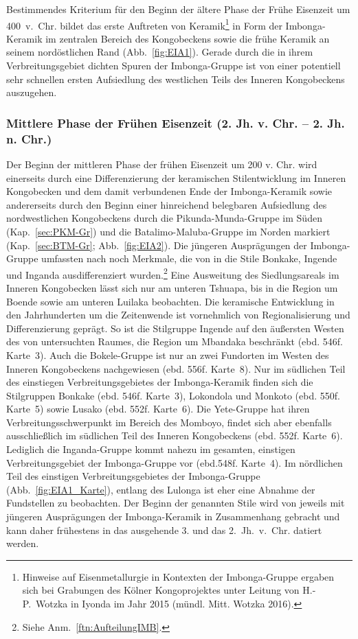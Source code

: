 Bestimmendes Kriterium für den Beginn der ältere Phase der Frühe Eisenzeit um 400~v.~Chr. bildet das erste Auftreten von Keramik\footnote{Hinweise auf Eisenmetallurgie in Kontexten der Imbonga-Gruppe ergaben sich bei Grabungen des Kölner Kongoprojektes unter Leitung von H.-P.~Wotzka in Iyonda im Jahr 2015 (mündl. Mitt. Wotzka 2016).\label{ftn:EisenIYO15/2-4}} in Form der Imbonga-Keramik im zentralen Bereich des Kongobeckens sowie die frühe Keramik an seinem nordöstlichen Rand (Abb.~\ref{fig:EIA1}). Gerade durch die in ihrem Verbreitungsgebiet dichten Spuren der Imbonga-Gruppe ist von einer potentiell sehr schnellen ersten Aufsiedlung des westlichen Teils des Inneren Kongobeckens auszugehen.

\subsubsection*{Mittlere Phase der Frühen Eisenzeit (2. Jh. v. Chr. -- 2. Jh. n. Chr.)}

Der Beginn der mittleren Phase der frühen Eisenzeit um 200 v. Chr. wird einerseits durch eine Differenzierung der keramischen Stilentwicklung im Inneren Kongobecken und dem damit verbundenen Ende der Imbonga-Keramik sowie andererseits durch den Beginn einer hinreichend belegbaren Aufsiedlung des nordwestlichen Kongobeckens durch die Pikunda-Munda-Gruppe im Süden (Kap.~\ref{sec:PKM-Gr}) und die Batalimo-Maluba-Gruppe im Norden markiert (Kap.~\ref{sec:BTM-Gr}; Abb.~\ref{fig:EIA2}). Die jüngeren Ausprägungen der Imbonga-Gruppe umfassten nach \textcite{Eggert.1983} noch Merkmale, die von \textcite{Wotzka.1995} in die Stile Bonkake, Ingende und Inganda ausdifferenziert wurden.\footnote{Siehe Anm.~\ref{ftn:AufteilungIMB}.} Eine Ausweitung des Siedlungsareals im Inneren Kongobecken lässt sich nur am unteren Tshuapa, bis in die Region um Boende sowie am unteren Luilaka beobachten. Die keramische Entwicklung in den Jahrhunderten um die Zeitenwende ist vornehmlich von Regionalisierung und Differenzierung geprägt. So ist die Stilgruppe Ingende auf den äußersten Westen des von \textcite{Wotzka.1995} untersuchten Raumes, die Region um Mbandaka beschränkt (ebd. 546f. Karte~3). Auch die Bokele-Gruppe ist nur an zwei Fundorten im Westen des Inneren Kongobeckens nachgewiesen (ebd. 556f. Karte~8). Nur im südlichen Teil des einstiegen Verbreitungsgebietes der Imbonga-Keramik finden sich die Stilgruppen Bonkake (ebd. 546f. Karte~3), Lokondola und Monkoto (ebd. 550f. Karte~5) sowie Lusako (ebd. 552f. Karte~6). Die Yete-Gruppe hat ihren Verbreitungsschwerpunkt im Bereich des Momboyo, findet sich aber ebenfalls ausschließlich im südlichen Teil des Inneren Kongobeckens (ebd. 552f. Karte~6). Lediglich die Inganda-Gruppe kommt nahezu im gesamten, einstigen Verbreitungsgebiet der Imbonga-Gruppe vor (ebd.548f. Karte~4). Im nördlichen Teil des einstigen Verbreitungsgebietes der Imbonga-Gruppe (Abb.~\ref{fig:EIA1_Karte}), entlang des Lulonga ist eher eine Abnahme der Fundstellen zu beobachten. Der Beginn der genannten Stile wird von \textcite{Wotzka.1995} jeweils mit jüngeren Ausprägungen der Imbonga-Keramik in Zusammenhang gebracht und kann daher frühestens in das ausgehende 3. und das 2.~Jh.~v.~Chr. datiert werden.

